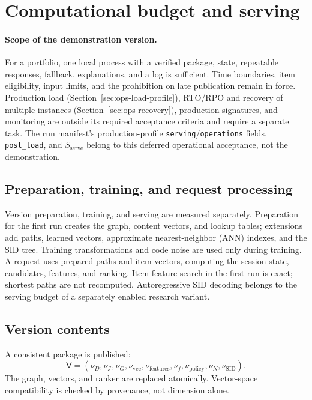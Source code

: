 \documentclass[12pt,a4paper]{article}
\newcommand{\code}[1]{{\ttfamily\small\nolinkurl{#1}}}
\theoremstyle{plainru}
\begin{document}
\section{Computational budget and serving}\label{sec:operations-serving}

\paragraph{Scope of the demonstration version.}
For a portfolio, one local process with a verified package,
state, repeatable responses, fallback, explanations, and a log is sufficient.
Time boundaries, item eligibility, input limits, and the prohibition
on late publication remain in force. Production load
(Section~\ref{sec:ops-load-profile}), RTO/RPO and recovery of multiple
instances (Section~\ref{sec:ops-recovery}), production signatures, and monitoring
are outside its required acceptance criteria and require a separate task.
The run manifest's production-profile \code{serving}/\code{operations} fields,
\code{post_load}, and $S_{\mathrm{serve}}$ belong to this deferred
operational acceptance, not the demonstration.

\subsection{Preparation, training, and request processing}
\label{sec:ops-compute-stages}

Version preparation, training, and serving are measured separately.
Preparation for the first run creates the graph, content vectors,
and lookup tables; extensions add paths, learned vectors,
approximate nearest-neighbor (ANN) indexes, and the SID tree.
Training transformations and code noise are used only during training.
A request uses prepared paths and item vectors, computing the session
state, candidates, features, and ranking. Item-feature search
in the first run is exact; shortest paths are not recomputed.
Autoregressive SID decoding belongs to the serving budget
of a separately enabled research variant.

\subsection{Version contents}

A consistent package is published:
\begin{equation}\label{eq:ops-package}
\mathsf V=(\nu_D,\nu_{\mathcal I},\nu_G,\nu_{\mathrm{vec}},
\nu_{\mathrm{features}},\nu_f,\nu_{\mathrm{policy}},
\nu_N,\nu_{\mathrm{SID}}).
\end{equation}
The graph, vectors, and ranker are replaced atomically.
Vector-space compatibility is checked by provenance,
not dimension alone.
\end{document}
